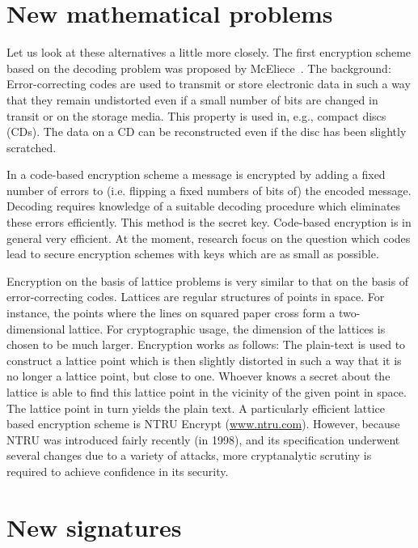 \section{New mathematical problems}
\label{sec:problems}

Let us look at these alternatives a little more
closely.  The first encryption scheme based on the
decoding problem was proposed by
McEliece~\cite{mceliece:1978}.  The background:
Error-correcting codes are used to transmit or
store electronic data in such a way that they
remain undistorted even if a small number of bits
are changed in transit or on the storage media.
This property is used in, e.g., compact discs
(CDs).  The data on a CD can be reconstructed even
if the disc has been slightly scratched.

In a code-based encryption scheme a message is
encrypted by adding a fixed number of errors to
(i.e. flipping a fixed numbers of bits of) the
encoded message.  Decoding requires knowledge of a
suitable decoding procedure which eliminates these
errors efficiently.  This method is the secret
key.  Code-based encryption is in general very
efficient.  At the moment, research focus on the
question which codes lead to secure encryption
schemes with keys which are as small as possible.

Encryption on the basis of lattice problems
is very similar to that on the basis of
error-correcting codes.  Lattices are regular
structures of points in space.  For instance, the
points where the lines on squared paper cross form
a two-dimensional lattice.  For cryptographic
usage, the dimension of the lattices is chosen to
be much larger.  Encryption works as follows: The
plain-text is used to construct a lattice point
which is then slightly distorted in such a way
that it is no longer a lattice point, but close to
one.  Whoever knows a secret about the lattice is
able to find this lattice point in the vicinity of
the given point in space.  The lattice point in
turn yields the plain text.  A particularly
efficient lattice based encryption scheme is NTRU
Encrypt (\url{www.ntru.com}).
However, because
NTRU was introduced fairly recently (in 1998), and
its specification underwent several changes due to
a variety of attacks, more cryptanalytic scrutiny
is required to achieve confidence in its security.

\section{New signatures}
\label{sec:signatures}

